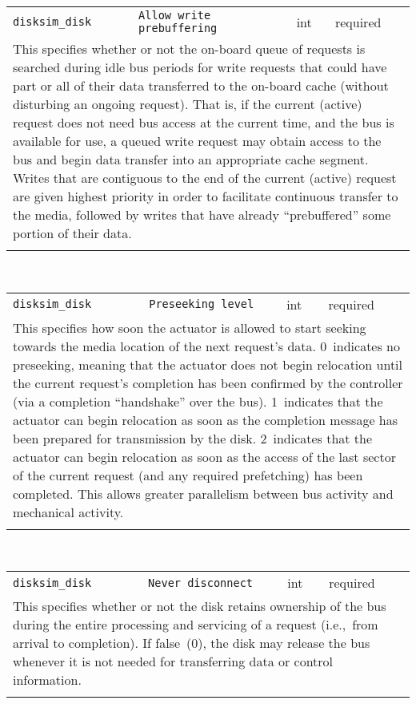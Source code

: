 \noindent 
\begin{tabular}{|p{1.5in}|p{3.5in}|p{0.5in}|p{0.5in}|}
\cline{1-4}
\texttt{disksim\_disk} & \texttt{Allow write prebuffering} & int & required \\ 
\cline{1-4}
\multicolumn{4}{|p{6in}|}{
This specifies whether or not the on-board queue of requests is searched
during idle bus periods for write requests that could have part or all
of their data transferred to the on-board cache (without disturbing an
ongoing request). That is, if the current (active) request does not
need bus access at the current time, and the bus is available for use,
a queued write request may obtain access to the bus and begin data
transfer into an appropriate cache segment. Writes that are
contiguous to the end of the current (active) request are given
highest priority in order to facilitate continuous transfer to the
media, followed by writes that have already ``prebuffered'' some
portion of their data.
}\\ 
\cline{1-4}
\multicolumn{4}{p{5in}}{}\\
\end{tabular}\\ 
\noindent 
\begin{tabular}{|p{1.5in}|p{3.5in}|p{0.5in}|p{0.5in}|}
\cline{1-4}
\texttt{disksim\_disk} & \texttt{Preseeking level} & int & required \\ 
\cline{1-4}
\multicolumn{4}{|p{6in}|}{
This specifies how soon the actuator is allowed to start seeking towards
the media location of the next request's data.
0~indicates no preseeking, meaning that the actuator does not begin
relocation until the current request's completion has been confirmed
by the controller (via a completion ``handshake'' over the bus).
1~indicates that the actuator can begin relocation as soon as the
completion message has been prepared for transmission by the disk.
2~indicates that the actuator can begin relocation as soon as the
access of the last sector of the current request (and any required
prefetching) has been completed. This allows greater parallelism
between bus activity and mechanical activity.
}\\ 
\cline{1-4}
\multicolumn{4}{p{5in}}{}\\
\end{tabular}\\ 
\noindent 
\begin{tabular}{|p{1.5in}|p{3.5in}|p{0.5in}|p{0.5in}|}
\cline{1-4}
\texttt{disksim\_disk} & \texttt{Never disconnect} & int & required \\ 
\cline{1-4}
\multicolumn{4}{|p{6in}|}{
This specifies whether or not the disk retains ownership of the bus during
the entire processing and servicing of a request (i.e.,~from arrival
to completion). If false~(0), the disk may release the bus whenever
it is not needed for transferring data or control information.
}\\ 
\cline{1-4}
\multicolumn{4}{p{5in}}{}\\
\end{tabular}\\ 
